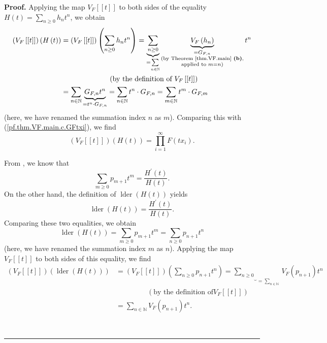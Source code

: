 \documentclass[numbers=enddot,12pt,final,onecolumn,notitlepage]{scrartcl}%
\theoremstyle{definition}
\newenvironment{proof}[1][Proof]{\noindent\textbf{#1.} }{\ \rule{0.5em}{0.5em}}
\let\sumnonlimits\sum
\let\prodnonlimits\prod
\renewcommand{\sum}{\sumnonlimits\limits}
\renewcommand{\prod}{\prodnonlimits\limits}
\newenvironment{verlong}{}{}
\begin{document}
\begin{verlong}
\begin{proof}
Applying the map $V_{F}\left[  \left[  t\right]  \right]  $ to both sides of
the equality $H\left(  t\right)  =\sum_{n\geq0}h_{n}t^{n}$, we obtain%
\begin{align*}
\left(  V_{F}\left[  \left[  t\right]  \right]  \right)  \left(  H\left(
t\right)  \right)   &  =\left(  V_{F}\left[  \left[  t\right]  \right]
\right)  \left(  \sum_{n\geq0}h_{n}t^{n}\right)  =\underbrace{\sum_{n\geq0}%
}_{=\sum_{n\in\mathbb{N}}}\underbrace{V_{F}\left(  h_{n}\right)
}_{\substack{=G_{F,n}\\\text{(by Theorem \ref{thm.VF.main} \textbf{(b)}%
,}\\\text{applied to }m=n\text{)}}}t^{n}\\
&  \ \ \ \ \ \ \ \ \ \ \ \ \ \ \ \ \ \ \ \ \left(  \text{by the definition of
}V_{F}\left[  \left[  t\right]  \right]  \right) \\
&  =\sum_{n\in\mathbb{N}}\underbrace{G_{F,n}t^{n}}_{=t^{n}\cdot G_{F,n}}%
=\sum_{n\in\mathbb{N}}t^{n}\cdot G_{F,n}=\sum_{m\in\mathbb{N}}t^{m}\cdot
G_{F,m}%
\end{align*}
(here, we have renamed the summation index $n$ as $m$). Comparing this with
(\ref{pf.thm.VF.main.c.GFtxi}), we find%
\begin{equation}
\left(  V_{F}\left[  \left[  t\right]  \right]  \right)  \left(  H\left(
t\right)  \right)  =\prod_{i=1}^{\infty}F\left(  tx_{i}\right)  .
\label{pf.thm.VF.main.c.GFtxi2}%
\end{equation}


From \cite[Exercise 2.5.21]{GriRei}, we know that%
\[
\sum_{m\geq0}p_{m+1}t^{m}=\dfrac{H^{\prime}\left(  t\right)  }{H\left(
t\right)  }.
\]
On the other hand, the definition of $\operatorname*{lder}\left(  H\left(
t\right)  \right)  $ yields%
\[
\operatorname*{lder}\left(  H\left(  t\right)  \right)  =\dfrac{H^{\prime
}\left(  t\right)  }{H\left(  t\right)  }.
\]
Comparing these two equalities, we obtain%
\[
\operatorname*{lder}\left(  H\left(  t\right)  \right)  =\sum_{m\geq0}%
p_{m+1}t^{m}=\sum_{n\geq0}p_{n+1}t^{n}%
\]
(here, we have renamed the summation index $m$ as $n$). Applying the map
$V_{F}\left[  \left[  t\right]  \right]  $ to both sides of this equality, we
find%
\begin{align}
\left(  V_{F}\left[  \left[  t\right]  \right]  \right)  \left(
\operatorname*{lder}\left(  H\left(  t\right)  \right)  \right)   &  =\left(
V_{F}\left[  \left[  t\right]  \right]  \right)  \left(  \sum_{n\geq0}%
p_{n+1}t^{n}\right)  =\underbrace{\sum_{n\geq0}}_{=\sum_{n\in\mathbb{N}}}%
V_{F}\left(  p_{n+1}\right)  t^{n}\nonumber\\
&  \ \ \ \ \ \ \ \ \ \ \ \ \ \ \ \ \ \ \ \ \left(  \text{by the definition of
}V_{F}\left[  \left[  t\right]  \right]  \right) \nonumber\\
&  =\sum_{n\in\mathbb{N}}V_{F}\left(  p_{n+1}\right)  t^{n}.
\label{pf.thm.VF.main.c.3}%
\end{align}



\end{proof}
\end{verlong}
\end{document}
